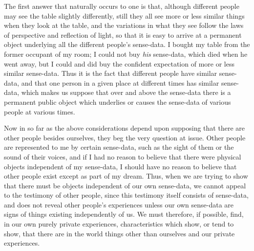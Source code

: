 \documentclass[oneside,letterpaper,12pt]{book}
\begin{document}
The first answer that naturally occurs to one is that, although
different people may see the table slightly differently, still they all
see more or less similar things when they look at the table, and the
variations in what they see follow the laws of perspective and
reflection of light, so that it is easy to arrive at a permanent object
underlying all the different people's sense-data. I
bought my table from the former occupant of my room; I could not buy
\emph{his} sense-data, which died when he went away, but I could and did
buy the confident expectation of more or less similar sense-data. Thus
it is the fact that different people have similar sense-data, and that
one person in a given place at different times has similar sense-data,
which makes us suppose that over and above the sense-data there is a
permanent public object which underlies or causes the sense-data of
various people at various times.

Now in so far as the above considerations depend upon supposing that
there are other people besides ourselves, they beg the very question at
issue. Other people are represented to me by certain sense-data, such as
the sight of them or the sound of their voices, and if I had no reason
to believe that there were physical objects independent of my
sense-data, I should have no reason to believe that other people exist
except as part of my dream. Thus, when we are trying to show that there
must be objects independent of our own sense-data, we cannot appeal to
the testimony of other people, since this testimony itself consists of
sense-data, and does not reveal other people's
experiences unless our own sense-data are signs of things existing
independently of us. We must therefore, if possible, find, in our own
purely private experiences, characteristics which show, or tend to show,
that there are in the world things other than ourselves and our private
experiences.
\end{document}
